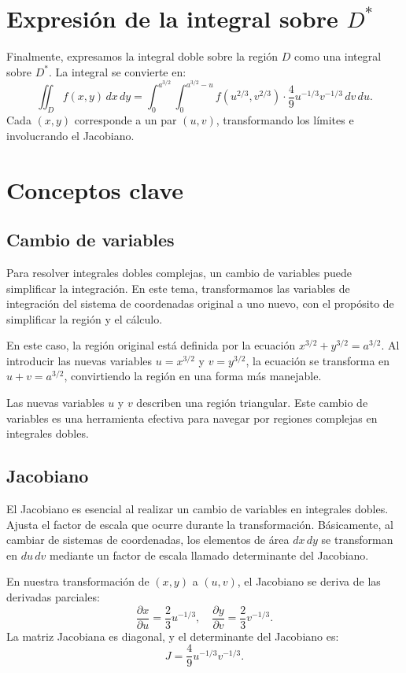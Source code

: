 \section*{Expresión de la integral sobre \( D^* \)}

Finalmente, expresamos la integral doble sobre la región \( D \) como una integral sobre \( D^* \). La integral se convierte en:
\[
\iint_D f(x, y) \, dx \, dy = \int_0^{a^{3/2}} \int_0^{a^{3/2} - u} f(u^{2/3}, v^{2/3}) \cdot \frac{4}{9} u^{-1/3} v^{-1/3} \, dv \, du.
\]
Cada \( (x, y) \) corresponde a un par \( (u, v) \), transformando los límites e involucrando el Jacobiano.

\section*{Conceptos clave}

\subsection*{Cambio de variables}

Para resolver integrales dobles complejas, un cambio de variables puede simplificar la integración. En este tema, transformamos las variables de integración del sistema de coordenadas original a uno nuevo, con el propósito de simplificar la región y el cálculo.

En este caso, la región original está definida por la ecuación \( x^{3/2} + y^{3/2} = a^{3/2} \). Al introducir las nuevas variables \( u = x^{3/2} \) y \( v = y^{3/2} \), la ecuación se transforma en \( u + v = a^{3/2} \), convirtiendo la región en una forma más manejable.

Las nuevas variables \( u \) y \( v \) describen una región triangular. Este cambio de variables es una herramienta efectiva para navegar por regiones complejas en integrales dobles.

\subsection*{Jacobiano}

El Jacobiano es esencial al realizar un cambio de variables en integrales dobles. Ajusta el factor de escala que ocurre durante la transformación. Básicamente, al cambiar de sistemas de coordenadas, los elementos de área \( dx \, dy \) se transforman en \( du \, dv \) mediante un factor de escala llamado determinante del Jacobiano.

En nuestra transformación de \( (x, y) \) a \( (u, v) \), el Jacobiano se deriva de las derivadas parciales:
\[
\frac{\partial x}{\partial u} = \frac{2}{3} u^{-1/3}, \quad
\frac{\partial y}{\partial v} = \frac{2}{3} v^{-1/3}.
\]
La matriz Jacobiana es diagonal, y el determinante del Jacobiano es:
\[
J = \frac{4}{9} u^{-1/3} v^{-1/3}.
\]

